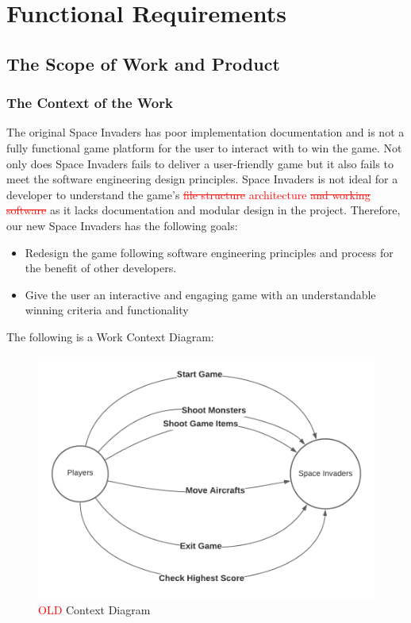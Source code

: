 \documentclass[12pt]{article}
\begin{document}
\section{Functional Requirements}
\subsection{The Scope of Work and Product}
\subsubsection{The Context of the Work}
The original Space Invaders has poor implementation documentation and is not a fully functional game platform for the user to interact with to win the game. Not only does Space Invaders fails to deliver a user-friendly game but it also fails to meet the software engineering design principles. Space Invaders is not ideal for a developer to understand the game’s \textcolor{red}{\st{file structure} architecture} \textcolor{red}{\st{and working software}} as it lacks documentation and modular design in the project. Therefore, our new Space Invaders has the following goals: 
\begin{itemize}
\item Redesign the game following software engineering principles and process for the benefit of other developers.
\item Give the user an interactive and engaging game with an understandable winning criteria and functionality
\end{itemize}
The following is a Work Context Diagram:
\begin{figure}[h!]
\begin{center}
\includegraphics[scale=1]{Context_Diagram.png}
\end{center}
\caption{\textcolor{red}{OLD} Context Diagram}
\end{figure}
\end{document}
